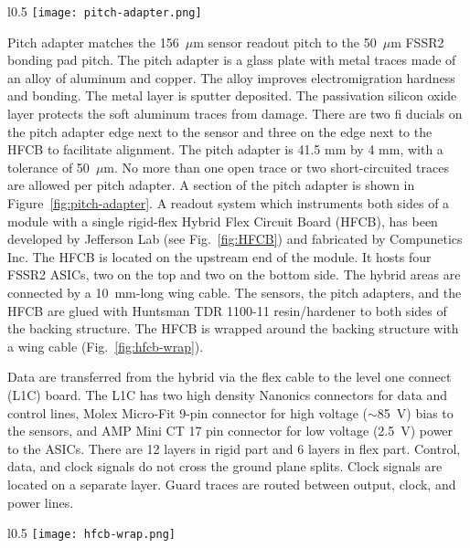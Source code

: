 \begin{wrapfigure}{l}{0.5\columnwidth}
\texttt{[image: pitch-adapter.png]}
\caption{One end of the pitch adapter mask, showing alignment fiducials, wire bonding pads, and traces.}
\label{fig:pitch-adapter}
\end{wrapfigure}

Pitch adapter matches the 156~$\mu$m sensor readout pitch to the 50~$\mu$m FSSR2 bonding pad pitch. The pitch adapter is a glass plate with metal traces made of an alloy of aluminum and copper. The alloy improves electromigration hardness and bonding. The metal layer is sputter deposited. The passivation silicon oxide layer protects the soft aluminum traces from damage. There are two fi ducials on the pitch adapter edge next to the sensor
and three on the edge next to the HFCB to facilitate alignment. The pitch adapter is 41.5 mm by 4 mm, with a tolerance of 50~$\mu$m. No more than one open trace or two short-circuited traces are allowed per pitch adapter. A section of the pitch adapter is shown in Figure~\ref{fig:pitch-adapter}. 
A readout system which instruments both sides of a module with a single rigid-flex Hybrid Flex Circuit Board (HFCB), has been developed by Jefferson Lab (see Fig.~\ref{fig:HFCB}) and fabricated by Compunetics Inc. The HFCB is located on the upstream end of the module. It hosts four FSSR2 ASICs, two on the top and two on the bottom side. The hybrid areas are connected by a 10~mm-long wing cable. The sensors, the pitch adapters, and the HFCB are glued with Huntsman TDR 1100-11 resin/hardener to both sides of the backing structure. The HFCB is wrapped around the backing structure with a wing cable (Fig.~\ref{fig:hfcb-wrap}). 

Data are transferred from the hybrid via the flex cable to the level one connect (L1C) board. The L1C has two high density Nanonics connectors for data and control lines, Molex Micro-Fit 9-pin connector for high voltage ($\sim$85~V) bias to the sensors, and AMP Mini CT 17 pin connector for low voltage (2.5~V) power to the ASICs. There are 12 layers in rigid part and 6 layers in flex part. Control, data, and clock signals do not cross the ground plane splits. Clock signals are located on a separate layer. Guard traces are routed between output, clock, and power lines. 

\begin{wrapfigure}{l}{0.5\columnwidth}
\texttt{[image: hfcb-wrap.png]}
\caption{HFCB wrap}
\label{fig:hfcb-wrap}
\end{wrapfigure}

